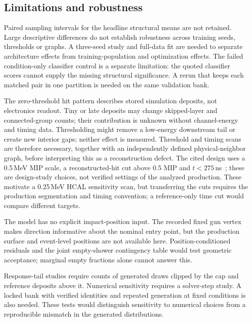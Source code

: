 \documentclass[10pt]{article}
\begin{document}
\subsection{Limitations and robustness}

Paired sampling intervals for the headline structural means are not retained. Large descriptive differences do not establish robustness across training seeds, thresholds or graphs. A three-seed study and full-data fit are needed to separate architecture effects from training-population and optimization effects. The failed condition-only classifier control is a separate limitation: the quoted classifier scores cannot supply the missing structural significance. A rerun that keeps each matched pair in one partition is needed on the same validation bank.

The zero-threshold hit pattern describes stored simulation deposits, not electronics readout. Tiny or late deposits may change skipped-layer and connected-group counts; their contribution is unknown without channel-energy and timing data. Thresholding might remove a low-energy downstream tail or create new interior gaps; neither effect is measured. Threshold and timing scans are therefore necessary, together with an independently defined physical-neighbor graph, before interpreting this as a reconstruction defect. The cited design uses a 0.5\,MeV MIP scale, a reconstructed-hit cut above 0.5 MIP and $t<275$\,ns~\cite{epiczdc}; these are design-study choices, not verified settings of the analyzed production. These motivate a 0.25\,MeV HCAL sensitivity scan, but transferring the cuts requires the production segmentation and timing convention; a reference-only time cut would compare different targets.

The model has no explicit impact-position input. The recorded fixed gun vertex makes direction informative about the nominal entry point, but the production surface and event-level positions are not available here. Position-conditioned residuals and the joint empty-shower contingency table would test geometric acceptance; marginal empty fractions alone cannot answer this.

Response-tail studies require counts of generated draws clipped by the cap and reference deposits above it. Numerical sensitivity requires a solver-step study. A locked bank with verified identities and repeated generation at fixed conditions is also needed. These tests would distinguish sensitivity to numerical choices from a reproducible mismatch in the generated distributions.
\end{document}

